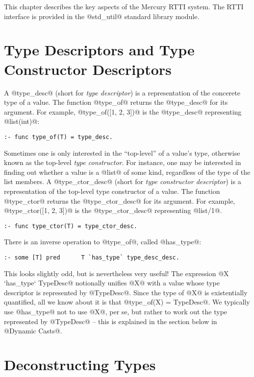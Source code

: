 This chapter describes the key aspects of the Mercury RTTI system.  The
RTTI interface is provided in the @std_util@ standard library module.

\section{Type Descriptors and Type Constructor Descriptors}

A @type_desc@ (short for \emph{type descriptor}) is a representation of
the concerete type of a value.  The function @type_of@ returns the
@type_desc@ for its argument.  For example, @type_of([1, 2, 3])@ is the
@type_desc@ representing @list(int)@:
\begin{verbatim}
:- func type_of(T) = type_desc.
\end{verbatim}

Sometimes one is only interested in the ``top-level'' of a value's type,
otherwise known as the top-level \emph{type constructor}.  For instance,
one may be interested in finding out whether a value is a @list@ of some
kind, regardless of the type of the list members.  A @type_ctor_desc@
(short for \emph{type constructor descriptor}) is a representation of
the top-level type constructor of a value.  The function @type_ctor@
returns the @type_ctor_desc@ for its argument.  For example,
@type_ctor([1, 2, 3])@ is the @type_ctor_desc@ representing @list/1@.
\begin{verbatim}
:- func type_ctor(T) = type_ctor_desc.
\end{verbatim}

There is an inverse operation to @type_of@, called @has_type@:
\begin{verbatim}
:- some [T] pred      T `has_type` type_desc_desc.
\end{verbatim}
This looks slightly odd, but is nevertheless very useful!  The
expression @X `has_type` TypeDesc@ notionally unifies @X@ with a value
whose type descriptor is represented by @TypeDesc@.  Since the type of
@X@ is existentially quantified, all we know about it is that
@type_of(X) = TypeDesc@.  We typically use @has_type@ not to use @X@,
per se, but rather to work out the type represented by @TypeDesc@ --
this is explained in the section below in @Dynamic Casts@.

\section{Deconstructing Types}

